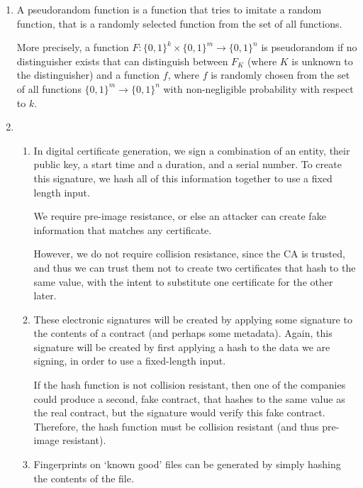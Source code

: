 


\begin{enumerate}[label=(\alph*)]

  \item
    A pseudorandom function is a function that tries to imitate a random function, that is a randomly selected function from the set of all functions.

    More precisely, a function $F : \{0,1\}^k \times \{0,1\}^m \rightarrow \{0,1\}^n$ is pseudorandom if no distinguisher exists that can distinguish between $F_K$ (where $K$ is unknown to the distinguisher) and a function $f$, where $f$ is randomly chosen from the set of all functions $\{0,1\}^m \rightarrow \{0,1\}^n$ with non-negligible probability with respect to $k$.

  \item
    \begin{enumerate}[label=(\roman*)]

      \item
        In digital certificate generation, we sign a combination of an entity, their public key, a start time and a duration, and a serial number. To create this signature, we hash all of this information together to use a fixed length input.


        We require pre-image resistance, or else an attacker can create fake information that matches any certificate. 

        However, we do not require collision resistance, since the CA is trusted, and thus we can trust them not to create two certificates that hash to the same value, with the intent to substitute one certificate for the other later.

      \item
        These electronic signatures will be created by applying some signature to the contents of a contract (and perhaps some metadata). Again, this signature will be created by first applying a hash to the data we are signing, in order to use a fixed-length input.

        If the hash function is not collision resistant, then one of the companies could produce a second, fake contract, that hashes to the same value as the real contract, but the signature would verify this fake contract. Therefore, the hash function must be collision resistant (and thus pre-image resistant).

      \item
        Fingerprints on `known good' files can be generated by simply hashing the contents of the file.



\end{enumerate}
\end{enumerate}
